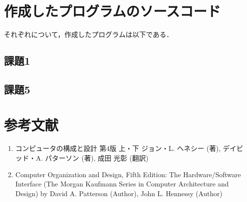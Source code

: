 \documentclass[a4j]{jarticle}
\begin{document}
%
%

\section{作成したプログラムのソースコード}

それぞれについて，作成したプログラムは以下である．

\subsection{課題1}






\subsection{課題5}





%
%

\section{参考文献}

\begin{enumerate}
\item コンピュータの構成と設計 第4版 上・下 ジョン・L. ヘネシー (著), デイビッド・A. パターソン (著), 成田 光彰 (翻訳)
\item Computer Organization and Design, Fifth Edition: The Hardware/Software Interface (The Morgan Kaufmann Series in Computer Architecture and Design) by David A. Patterson (Author), John L. Hennessy  (Author)
\end{enumerate}
\end{document}
